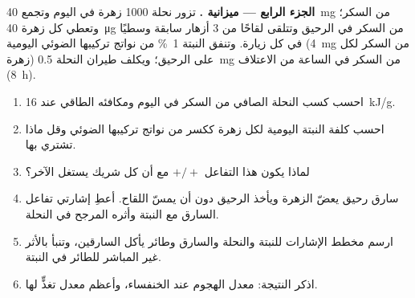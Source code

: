\begin{problem}
\medskip
\noindent\textbf{الجزء الرابع --- ميزانية .}
تزور نحلة 1000 زهرة في اليوم وتجمع \qty{40}{mg} من السكر؛
وتعطي كل زهرة \qty{40}{\micro g} من السكر في الرحيق وتتلقى
لقاحًا من 3 أزهار سابقة وسطيًا في كل زيارة. وتنفق النبتة
\qty{1}{\%} من نواتج تركيبها الضوئي اليومية (\qty{4}{mg} من السكر لكل
زهرة) على الرحيق؛ ويكلف طيران النحلة \qty{0.5}{mg} من السكر في
الساعة من الاعتلاف (\qty{8}{h}).
\begin{enumerate}[resume]
  \item احسب كسب النحلة الصافي من السكر في اليوم ومكافئه
        الطاقي عند \qty{16}{kJ/g}.
  \item احسب كلفة النبتة اليومية لكل زهرة ككسر من
        نواتج تركيبها الضوئي وقل ماذا تشتري بها.
  \item لماذا يكون هذا التفاعل $+/+$ مع أن كل شريك
        يستغل الآخر؟
  \item سارق رحيق يعضّ  الزهرة ويأخذ
        الرحيق دون أن يمسّ اللقاح. أعطِ إشارتي تفاعل
        السارق مع النبتة وأثره المرجح في النحلة.
  \item ارسم مخطط الإشارات للنبتة والنحلة والسارق وطائر
        يأكل السارقين، وتنبأ بالأثر غير المباشر للطائر في
        النبتة.
  \item اذكر النتيجة: معدل الهجوم  عند
        الخنفساء، وأعظم معدل تغذٍّ لها.
\end{enumerate}
\end{problem}
